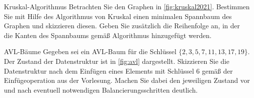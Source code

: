 \documentclass{article}
\begin{document}
\begin{exercise}{Kruskal-Algorithmus}
  Betrachten Sie den Graphen in \ref{fig:kruskal2021}. Bestimmen Sie mit Hilfe des Algorithmus von Kruskal einen minimalen Spannbaum des Graphen und skizzieren diesen. Geben Sie zusätzlich die Reihenfolge an, in der die Kanten des Spannbaums gemäß Algorithmus hinzugefügt werden.
  

  \begin{solution}
    
  \end{solution}
\end{exercise}

\begin{exercise}{AVL-Bäume}
  Gegeben sei ein AVL-Baum für die Schlüssel $\{2,3,5,7,11,13,17,19\}$. Der Zustand der Datenstruktur ist in \ref{fig:avl} dargestellt. Skizzieren Sie die Datenstruktur nach dem Einfügen eines Elements mit Schlüssel 6 gemäß der Einfügeoperation aus der Vorlesung. Machen Sie dabei den jeweiligen Zustand vor und nach eventuell notwendigen Balancierungsschritten deutlich.
  

  \begin{solution}
    
  \end{solution}
\end{exercise}
\end{document}
